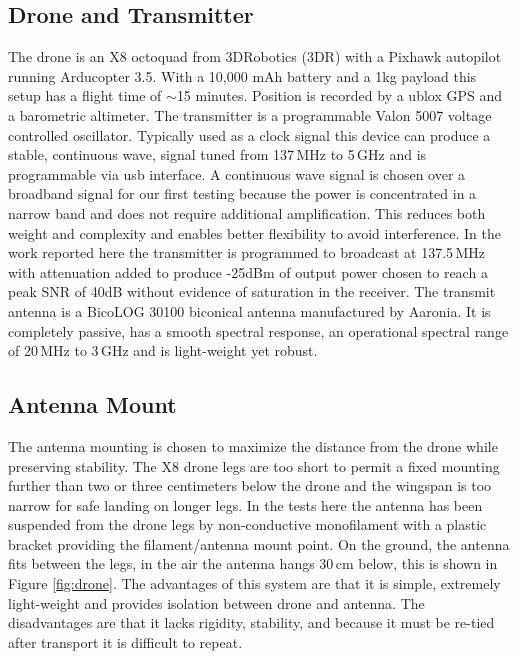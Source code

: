 \documentclass[preprint2,numberedappendix,tighten,twocolappendix]{aastex6}
\begin{document}
\subsection{Drone and Transmitter}
The drone is an X8 octoquad from 3DRobotics (3DR) with a Pixhawk autopilot running Arducopter 3.5.  With a 10,000 mAh battery and a 1kg payload this setup has a flight time of $\sim$15 minutes. Position is recorded by a ublox GPS and a barometric altimeter.  The transmitter is a programmable Valon 5007 voltage controlled oscillator. Typically used as a clock signal this device can produce a stable, continuous wave, signal tuned from 137\,MHz to 5\,GHz and is programmable via usb interface.  A continuous wave signal is chosen over a broadband signal for our first testing because the power is concentrated in a narrow band and does not require additional amplification. This reduces both weight and complexity and enables better flexibility to avoid interference.  In the work reported here the transmitter is programmed to broadcast at 137.5\,MHz with attenuation added to produce -25dBm of output power chosen to reach a peak SNR of 40dB without evidence of saturation in the receiver.  The transmit antenna is a BicoLOG 30100 biconical antenna manufactured by Aaronia. It is completely passive, has a smooth spectral response, an operational spectral range of 20\,MHz to 3\,GHz and is light-weight yet robust. 



\subsection{Antenna Mount}
The antenna mounting is chosen to maximize the distance from the drone while preserving stability. The X8 drone legs are too short to permit a fixed mounting further than two or three centimeters below the drone and the wingspan is too narrow for safe landing on longer legs. In the tests here the antenna has been suspended from the drone legs by non-conductive monofilament with a plastic bracket providing the filament/antenna mount point. On the ground, the antenna fits between the legs, in the air the antenna hangs 30\,cm below, this is shown in Figure \ref{fig:drone}. The advantages of this system are that it is simple, extremely light-weight and provides isolation between drone and antenna. The disadvantages are that it lacks rigidity, stability, and because it must be re-tied after transport it is difficult to repeat.
\end{document}
